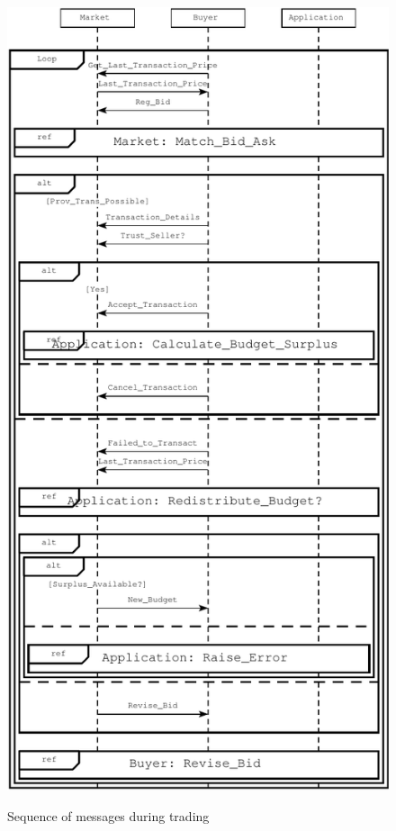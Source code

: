 \documentclass[10pt,journal,compsoc]{IEEEtran}
\begin{document}
\begin{figure}
	\centering
	\includegraphics[scale=0.6]{drawings/trading_phase.pdf}
	\label{trading_phase}
	\caption{Sequence of messages during trading}
\end{figure}
\end{document}
